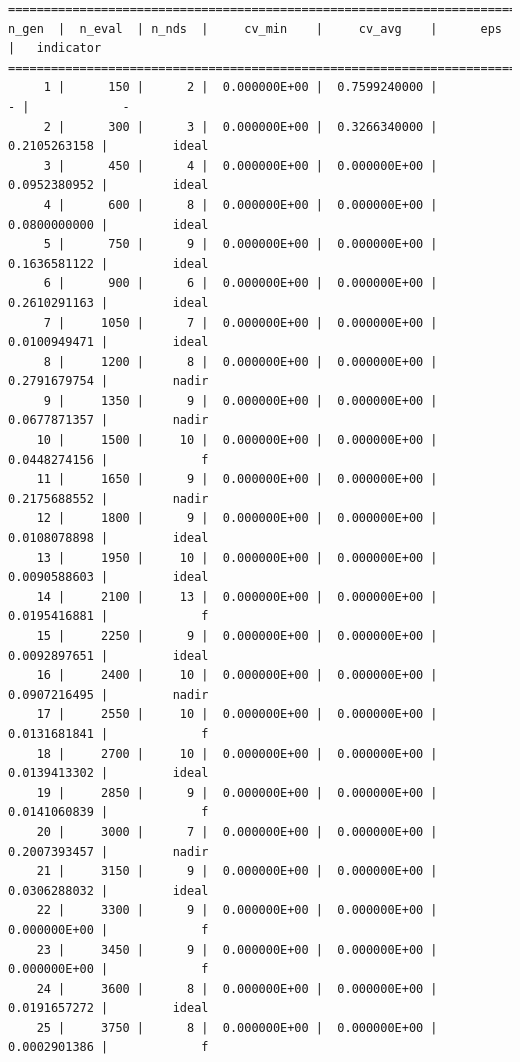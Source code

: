 \documentclass[
  authoryear,
  preprint,
  3p]{elsarticle}
\begin{document}
\begin{verbatim}
==========================================================================================
n_gen  |  n_eval  | n_nds  |     cv_min    |     cv_avg    |      eps      |   indicator  
==========================================================================================
     1 |      150 |      2 |  0.000000E+00 |  0.7599240000 |             - |             -
     2 |      300 |      3 |  0.000000E+00 |  0.3266340000 |  0.2105263158 |         ideal
     3 |      450 |      4 |  0.000000E+00 |  0.000000E+00 |  0.0952380952 |         ideal
     4 |      600 |      8 |  0.000000E+00 |  0.000000E+00 |  0.0800000000 |         ideal
     5 |      750 |      9 |  0.000000E+00 |  0.000000E+00 |  0.1636581122 |         ideal
     6 |      900 |      6 |  0.000000E+00 |  0.000000E+00 |  0.2610291163 |         ideal
     7 |     1050 |      7 |  0.000000E+00 |  0.000000E+00 |  0.0100949471 |         ideal
     8 |     1200 |      8 |  0.000000E+00 |  0.000000E+00 |  0.2791679754 |         nadir
     9 |     1350 |      9 |  0.000000E+00 |  0.000000E+00 |  0.0677871357 |         nadir
    10 |     1500 |     10 |  0.000000E+00 |  0.000000E+00 |  0.0448274156 |             f
    11 |     1650 |      9 |  0.000000E+00 |  0.000000E+00 |  0.2175688552 |         nadir
    12 |     1800 |      9 |  0.000000E+00 |  0.000000E+00 |  0.0108078898 |         ideal
    13 |     1950 |     10 |  0.000000E+00 |  0.000000E+00 |  0.0090588603 |         ideal
    14 |     2100 |     13 |  0.000000E+00 |  0.000000E+00 |  0.0195416881 |             f
    15 |     2250 |      9 |  0.000000E+00 |  0.000000E+00 |  0.0092897651 |         ideal
    16 |     2400 |     10 |  0.000000E+00 |  0.000000E+00 |  0.0907216495 |         nadir
    17 |     2550 |     10 |  0.000000E+00 |  0.000000E+00 |  0.0131681841 |             f
    18 |     2700 |     10 |  0.000000E+00 |  0.000000E+00 |  0.0139413302 |         ideal
    19 |     2850 |      9 |  0.000000E+00 |  0.000000E+00 |  0.0141060839 |             f
    20 |     3000 |      7 |  0.000000E+00 |  0.000000E+00 |  0.2007393457 |         nadir
    21 |     3150 |      9 |  0.000000E+00 |  0.000000E+00 |  0.0306288032 |         ideal
    22 |     3300 |      9 |  0.000000E+00 |  0.000000E+00 |  0.000000E+00 |             f
    23 |     3450 |      9 |  0.000000E+00 |  0.000000E+00 |  0.000000E+00 |             f
    24 |     3600 |      8 |  0.000000E+00 |  0.000000E+00 |  0.0191657272 |         ideal
    25 |     3750 |      8 |  0.000000E+00 |  0.000000E+00 |  0.0002901386 |             f

\end{verbatim}
\end{document}
